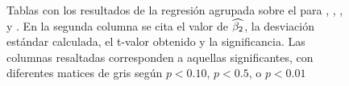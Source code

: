 \begin{figure}
\caption{Tablas con los resultados de la regresión agrupada sobre el \entrainment para \NOISETOHARMONICS, \SYLAVG, \PHONAVG, \LOCALSHIMMER y \LOCALJITTER. En la segunda columna se cita el valor de $\widehat{\beta_2}$, la desviación estándar calculada, el t-valor obtenido y la significancia. Las columnas resaltadas corresponden a aquellas significantes, con diferentes matices de gris según $p < 0.10$, $p < 0.5$, o $p < 0.01$}

\label{fig:regresion_clasica_tabla_2}
\end{figure}
